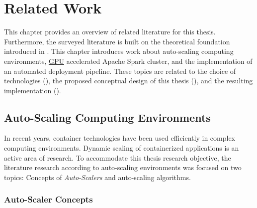 \chapter{Related Work}
\label{chap:03_related-work}


This chapter provides an overview of related literature for this thesis. Furthermore, the surveyed literature is built on the theoretical foundation introduced in . This chapter introduces work about auto-scaling computing environments, \hyperlink{abbr:gpu}{GPU} accelerated Apache Spark cluster, and the implementation of an automated deployment pipeline. These topics are related to the choice of technologies (), the proposed conceptual design of this thesis (), and the resulting implementation ().


\section{Auto-Scaling Computing Environments}
In recent years, container technologies have been used efficiently in complex computing environments. Dynamic scaling of containerized applications is an active area of research.
To accommodate this thesis research objective, the literature research according to auto-scaling environments was focused on two topics: Concepts of \textit{Auto-Scalers}  and auto-scaling algorithms.


\subsection{Auto-Scaler Concepts}
